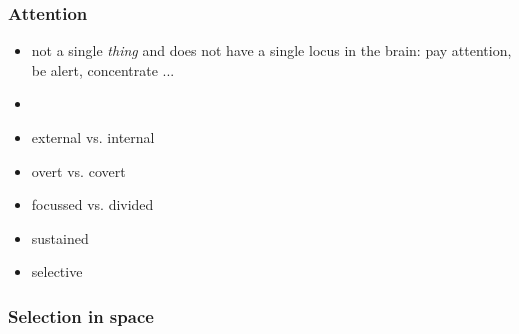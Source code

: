 \documentclass[]{beamer}
\begin{document}
\begin{frame}
\frametitle{Attention}
\begin{overlayarea}{110mm}{80mm}
\begin{itemize}
 \item<1-> not a single \textit{thing} and does not have a single locus in the brain: pay attention, be alert, concentrate ...
 \item[]
 \item<2-> external vs. internal
 \item<3-> overt vs. covert
 \item<4-> focussed vs. divided
 \item<5-> sustained
 \item<6-> selective
\end{itemize}
\end{overlayarea}
\end{frame}


\begin{frame}
 \frametitle{Selection in space}
\begin{overlayarea}{130mm}{75mm}

\end{overlayarea}
\end{frame}
\end{document}
